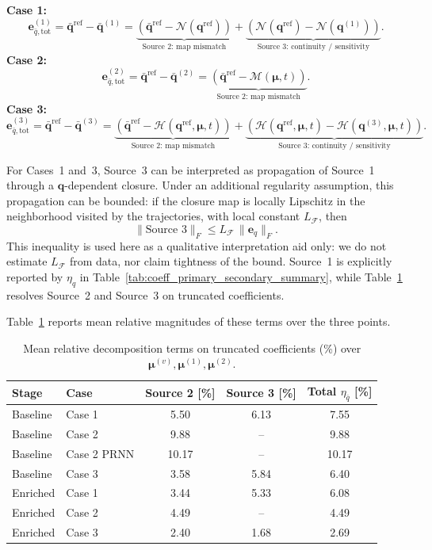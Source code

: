 \documentclass[11pt]{article}
\begin{document}
\textbf{Case 1:}
\[
\mathbf e_{\bar q,\mathrm{tot}}^{(1)}
=\bar{\mathbf q}^{\mathrm{ref}}-\bar{\mathbf q}^{(1)}
=\underbrace{\left(\bar{\mathbf q}^{\mathrm{ref}}-\mathcal N(\mathbf q^{\mathrm{ref}})\right)}_{\text{Source 2: map mismatch}}
+\underbrace{\left(\mathcal N(\mathbf q^{\mathrm{ref}})-\mathcal N(\mathbf q^{(1)})\right)}_{\text{Source 3: continuity / sensitivity}}.
\]
\textbf{Case 2:}
\[
\mathbf e_{\bar q,\mathrm{tot}}^{(2)}
=\bar{\mathbf q}^{\mathrm{ref}}-\bar{\mathbf q}^{(2)}
=\underbrace{\left(\bar{\mathbf q}^{\mathrm{ref}}-\mathcal M(\bm\mu,t)\right)}_{\text{Source 2: map mismatch}}.
\]
\textbf{Case 3:}
\[
\mathbf e_{\bar q,\mathrm{tot}}^{(3)}
=\bar{\mathbf q}^{\mathrm{ref}}-\bar{\mathbf q}^{(3)}
=\underbrace{\left(\bar{\mathbf q}^{\mathrm{ref}}-\mathcal H(\mathbf q^{\mathrm{ref}},\bm\mu,t)\right)}_{\text{Source 2: map mismatch}}
+\underbrace{\left(\mathcal H(\mathbf q^{\mathrm{ref}},\bm\mu,t)-\mathcal H(\mathbf q^{(3)},\bm\mu,t)\right)}_{\text{Source 3: continuity / sensitivity}}.
\]

For Cases~1 and~3, Source~3 can be interpreted as propagation of Source~1 through a $\mathbf q$-dependent closure. Under an additional regularity assumption, this propagation can be bounded: if the closure map is locally Lipschitz in the neighborhood visited by the trajectories, with local constant $L_{\mathcal F}$, then
\[
\|\text{Source 3}\|_F \le L_{\mathcal F}\,\|\mathbf e_q\|_F.
\]
This inequality is used here as a qualitative interpretation aid only: we do not estimate $L_{\mathcal F}$ from data, nor claim tightness of the bound. Source~1 is explicitly reported by $\eta_q$ in Table~\ref{tab:coeff_primary_secondary_summary}, while Table~\ref{tab:decomposition_summary_250} resolves Source~2 and Source~3 on truncated coefficients.

Table~\ref{tab:decomposition_summary_250} reports mean relative magnitudes of these terms over the three points.

\begin{table}[H]
\centering
\caption{Mean relative decomposition terms on truncated coefficients (\%) over $\bm\mu^{(v)},\bm\mu^{(1)},\bm\mu^{(2)}$.}
\label{tab:decomposition_summary_250}
\begin{tabular}{llccc}
\hline
Stage & Case & Source 2 [\%] & Source 3 [\%] & Total $\eta_{\bar q}$ [\%] \\
\hline
Baseline & Case 1 & 5.50 & 6.13 & 7.55 \\
Baseline & Case 2 & 9.88 & -- & 9.88 \\
Baseline & Case 2 PRNN & 10.17 & -- & 10.17 \\
Baseline & Case 3 & 3.58 & 5.84 & 6.40 \\
Enriched & Case 1 & 3.44 & 5.33 & 6.08 \\
Enriched & Case 2 & 4.49 & -- & 4.49 \\
Enriched & Case 3 & 2.40 & 1.68 & 2.69 \\
\hline
\end{tabular}
\end{table}
\end{document}
